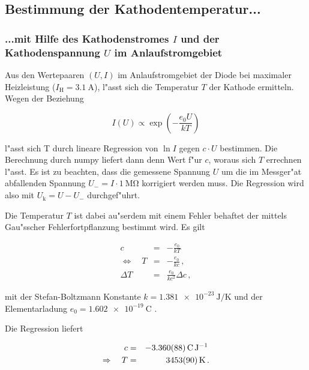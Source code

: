 		\enlargethispage{10cm}

		\clearpage

	\subsection{Bestimmung der Kathodentemperatur...}
		\subsubsection{...mit Hilfe des Kathodenstromes $I$ und der Kathodenspannung $U$ im Anlaufstromgebiet}
			\label{subsubsec:temp1}
			Aus den Wertepaaren $(U,I)$ im Anlaufstromgebiet der Diode bei maximaler Heizleistung ($I_\mathrm{H} = \SI{3.1}{\ampere}$), l"asst sich die Temperatur $T$ der Kathode ermitteln.
			Wegen der Beziehung

			\begin{equation*}
				I(U) \propto \exp{\left(-\frac{e_0 U}{kT}\right)}
			\end{equation*}

			l"asst sich T durch lineare Regression von $\ln{I}$ gegen $c\cdot U$ bestimmen. Die Berechnung durch numpy liefert dann denn Wert f"ur $c$, woraus sich $T$ errechnen l"asst.
			Es ist zu beachten, dass die gemessene Spannung $U$ um die im Messger"at abfallenden Spannung $U_- = I \cdot \SI{1}{\mega \ohm}$ korrigiert werden muss.
			Die Regression wird also mit $U_\mathrm{k} = U - U_-$ durchgef"uhrt.

			Die Temperatur $T$ ist dabei au"serdem mit einem Fehler behaftet der mittels Gau"sscher Fehlerfortpflanzung bestimmt wird.
			Es gilt

			\begin{eqnarray*}
				c & = & -\frac{e_0}{kT}\,\\
				\Leftrightarrow \quad T & = & -\frac{e_0}{kc}\,,\\
				\Delta T & = & \frac{e_0}{kc^2}\Delta c\,,
			\end{eqnarray*}

			mit der Stefan-Boltzmann Konstante $k = \SI{1.381e-23}{\joule \per \kelvin}$ \cite{nist} und der Elementarladung $e_0 = \SI{1.602e-19}{\coulomb}$ \cite{nist}.

			Die Regression liefert

			\begin{eqnarray*}
				c & = & \SI{-3.360 (88)}{\coulomb \per \joule}\,\\
				\Rightarrow \quad T & = & \SI{3453 (90)}{\kelvin}\,.
			\end{eqnarray*}

